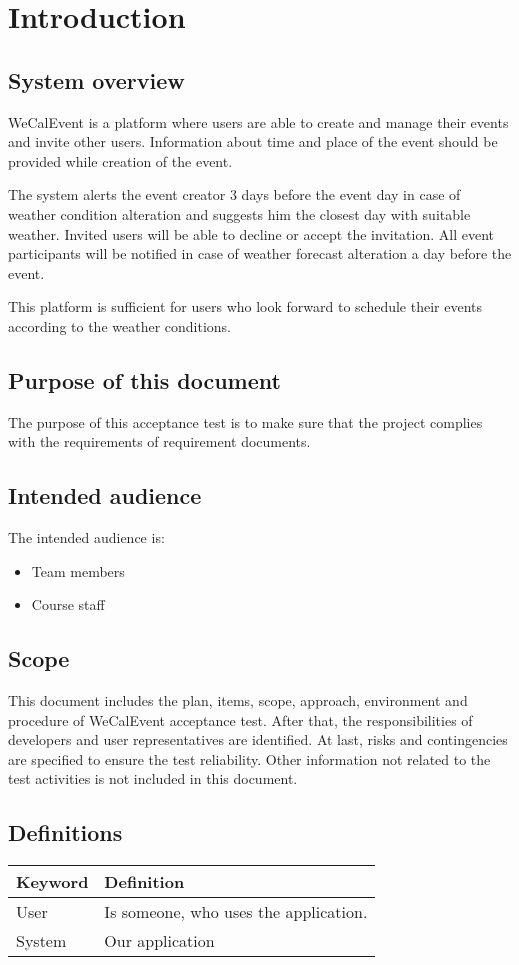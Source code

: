 \section{Introduction}
\subsection{System overview}
\par WeCalEvent is a platform where users are able to create and manage their events and invite other
users. Information about time and place of the event should be provided while creation of the event.
\par The system alerts the event creator 3 days before the event day in case of weather condition alteration
and suggests him the closest day with suitable weather.
Invited users will be able to decline or accept the invitation. All event participants will be notified
in case of weather forecast alteration a day before the event.
\par This platform is sufficient for users who look forward to schedule their events according to the
weather conditions.
\subsection{Purpose of this document}
\par The purpose of this acceptance test is to make sure that the project complies with the requirements of requirement documents.
\subsection{Intended audience}
\par The intended audience is:
\begin{itemize}
  \item Team members
  \item Course staff
\end{itemize}

\subsection{Scope} This document includes the plan, items, scope, approach, environment and procedure of WeCalEvent
acceptance test. After that, the responsibilities of developers and user representatives are identified. At
last, risks and contingencies are specified to ensure the test reliability. Other information not related to the
test activities is not included in this document.
\subsection{Definitions}
\begin{tabular}{|l|l|}
  \hline
  \textbf{Keyword} & \textbf{Definition} \\
  \hline
  User & Is someone, who uses the application. \\
  \hline
  System & Our application \\
  \hline
\end{tabular}
